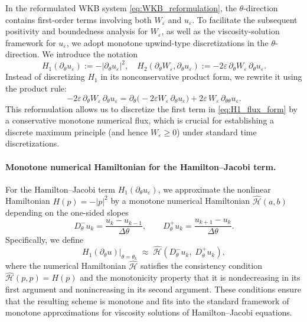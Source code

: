 \documentclass[11pt, dina4, amsfont12]{article}
\begin{document}
In the reformulated WKB system \eqref{eq:WKB_reformulation}, the
$\theta$-direction contains first-order terms involving both
$W_\varepsilon$ and $u_\varepsilon$.
To facilitate the subsequent positivity and boundedness analysis for
$W_\varepsilon$, as well as the viscosity-solution framework for
$u_\varepsilon$, we adopt monotone upwind-type discretizations in the
$\theta$-direction.
We introduce the notation
\[
H_1(\partial_\theta u_\varepsilon)
:= -|\partial_\theta u_\varepsilon|^2,
\quad
H_2(\partial_\theta W_\varepsilon,\partial_\theta u_\varepsilon)
:= -2\varepsilon\,\partial_\theta W_\varepsilon\,\partial_\theta u_\varepsilon.
\]
Instead of discretizing $H_1$ in its nonconservative product form, we rewrite it
using the product rule:
\begin{equation}\label{eq:H1_flux_form}
-2\varepsilon\, \partial_\theta W_\varepsilon\, \partial_\theta u_\varepsilon
=
\partial_\theta\!\bigl(-2\varepsilon W_\varepsilon\,\partial_\theta u_\varepsilon\bigr)
+ 2\varepsilon\, W_\varepsilon\, \partial_{\theta\theta}u_\varepsilon .
\end{equation}
This reformulation allows us to discretize the first term in
\eqref{eq:H1_flux_form} by a conservative monotone numerical flux, which is
crucial for establishing a discrete maximum principle (and hence
$W_\varepsilon\ge 0$) under standard time discretizations.

\paragraph{Monotone numerical Hamiltonian for the Hamilton--Jacobi term.}
For the Hamilton--Jacobi term $H_1(\partial_\theta u_\varepsilon)$, we approximate
the nonlinear Hamiltonian $H(p)=-|p|^2$ by a monotone numerical Hamiltonian
$\widehat{\mathcal H}(a,b)$ depending on the one-sided slopes
\[
D_\theta^- u_k=\frac{u_k-u_{k-1}}{\Delta\theta},
\qquad
D_\theta^+ u_k=\frac{u_{k+1}-u_k}{\Delta\theta}.
\]
Specifically, we define
\[
H_1(\partial_\theta u)\Big|_{\theta=\theta_k}
\;\approx\;
\widehat{\mathcal H}\!\left(D_\theta^- u_k,\; D_\theta^+ u_k\right),
\]
where the numerical Hamiltonian $\widehat{\mathcal H}$ satisfies the consistency
condition $\widehat{\mathcal H}(p,p)=H(p)$ and the monotonicity property that it
is nondecreasing in its first argument and nonincreasing in its second argument.
These conditions ensure that the resulting scheme is monotone and fits into the
standard framework of monotone approximations for viscosity solutions of
Hamilton--Jacobi equations.
\end{document}
